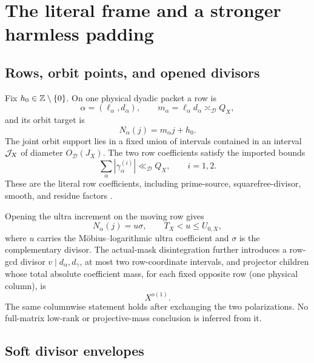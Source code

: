 \section{The literal frame and a stronger harmless padding}
\label{sec:physical-frame}

\subsection{Rows, orbit points, and opened divisors}

Fix \(h_0\in\mathbb Z\setminus\{0\}\).  On one physical dyadic packet a row
is
\[
 \alpha=(\ell_\alpha,d_\alpha),\qquad
 m_\alpha=\ell_\alpha d_\alpha\asymp_{\mathscr D}Q_X,
\]
and its orbit target is
\begin{equation}
 N_\alpha(j)=m_\alpha j+h_0.
\label{eq:physical-target}
\end{equation}
The joint orbit support lies in a fixed union of intervals contained
in an interval \(\mathcal J_X\) of diameter \(O_{\mathscr D}(J_X)\).
The two row coefficients satisfy the imported bounds
\begin{equation}
 \sum_\alpha|\gamma_\alpha^{(i)}|
 \ll_{\mathscr D}Q_X,
 \qquad i=1,2.
\label{eq:row-l1}
\end{equation}
These are the literal row coefficients, including prime-source,
squarefree-divisor, smooth, and residue factors
\citep{WangTPC33}.

Opening the ultra increment on the moving row gives
\begin{equation}
 N_\alpha(j)=u\sigma,
 \qquad T_X<u\le U_{0,X},
\label{eq:opened-factorization}
\end{equation}
where \(u\) carries the M\"obius--logarithmic ultra coefficient and
\(\sigma\) is the complementary divisor.  The actual-mask
disintegration further introduces a row-gcd divisor \(v\mid
d_\alpha,d_\gamma\), at most two row-coordinate intervals, and
projector children whose total absolute coefficient mass, for each
fixed opposite row (one physical column), is
\begin{equation}
 X^{o(1)}.
\label{eq:projector-soft-mass}
\end{equation}
The same columnwise statement holds after exchanging the two
polarizations.  No full-matrix low-rank or projective-mass conclusion
is inferred from it.

\subsection{Soft divisor envelopes}

